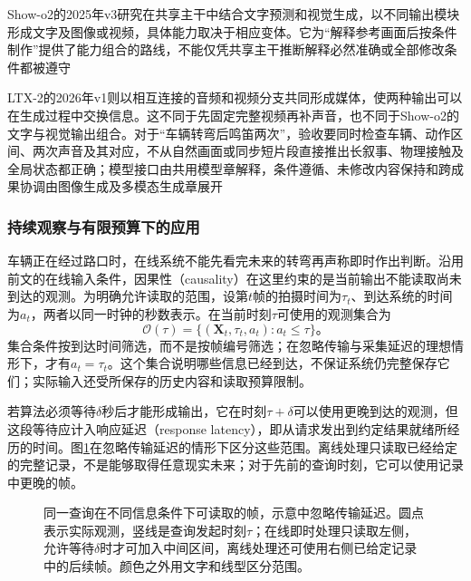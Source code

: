 Show-o2的2025年v3研究在共享主干中结合文字预测和视觉生成，以不同输出模块形成文字及图像或视频，具体能力取决于相应变体。它为“解释参考画面后按条件制作”提供了能力组合的路线，不能仅凭共享主干推断解释必然准确或全部修改条件都被遵守

LTX-2的2026年v1则以相互连接的音频和视频分支共同形成媒体，使两种输出可以在生成过程中交换信息。这不同于先固定完整视频再补声音，也不同于Show-o2的文字与视觉输出组合。对于“车辆转弯后鸣笛两次”，验收要同时检查车辆、动作区间、两次声音及其对应，不从自然画面或同步短片段直接推出长叙事、物理接触及全局状态都正确；模型接口由共用模型章解释，条件遵循、未修改内容保持和跨成果协调由图像生成及多模态生成章展开

\subsubsection{持续观察与有限预算下的应用}
\label{sec:vision-overview-streaming-frontier}

车辆正在经过路口时，在线系统不能先看完未来的转弯再声称即时作出判断。沿用前文的在线输入条件，因果性（causality）在这里约束的是当前输出不能读取尚未到达的观测。为明确允许读取的范围，设第$t$帧的拍摄时间为$\tau_t$、到达系统的时间为$a_t$，两者以同一时钟的秒数表示。在当前时刻$\tau$可使用的观测集合为
\begin{equation}
  \mathcal{O}(\tau)
  =\{(\bm{X}_t,\tau_t,a_t):a_t\leq\tau\}\text{。}
  \label{eq:vision-causal-observations}
\end{equation}
集合条件按到达时间筛选，而不是按帧编号筛选；在忽略传输与采集延迟的理想情形下，才有$a_t=\tau_t$。这个集合说明哪些信息已经到达，不保证系统仍完整保存它们；实际输入还受所保存的历史内容和读取预算限制。

若算法必须等待$\delta$秒后才能形成输出，它在时刻$\tau+\delta$可以使用更晚到达的观测，但这段等待应计入响应延迟（response latency），即从请求发出到约定结果就绪所经历的时间。图\ref{fig:vision-observation-window}在忽略传输延迟的情形下区分这些范围。离线处理只读取已经给定的完整记录，不是能够取得任意现实未来；对于先前的查询时刻，它可以使用记录中更晚的帧。

\begin{figure}[htbp]
  \centering
  
  \caption{同一查询在不同信息条件下可读取的帧，示意中忽略传输延迟。圆点表示实际观测，竖线是查询发起时刻$\tau$；在线即时处理只读取左侧，允许等待$\delta$时才可加入中间区间，离线处理还可使用右侧已给定记录中的后续帧。颜色之外用文字和线型区分范围。}
  \label{fig:vision-observation-window}
\end{figure}

